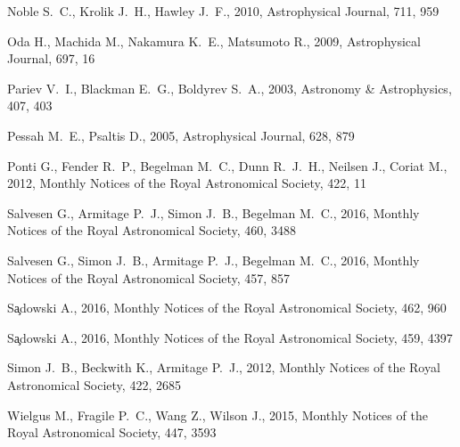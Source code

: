 \documentclass[useAMS,usenatbib]{mn2e}
\newcommand\apj{Astrophysical Journal}
\newcommand\aap{Astronomy \& Astrophysics}
\newcommand\mnras{Monthly Notices of the Royal Astronomical Society}
\begin{document}
\begin{thebibliography}{33}
{Noble} S.~C., {Krolik} J.~H., {Hawley} J.~F., 2010, \apj, 711, 959

{Oda} H., {Machida} M., {Nakamura} K.~E., {Matsumoto} R., 2009, \apj, 697, 16

{Pariev} V.~I., {Blackman} E.~G., {Boldyrev} S.~A., 2003, \aap, 407, 403

{Pessah} M.~E., {Psaltis} D., 2005, \apj, 628, 879

{Ponti} G., {Fender} R.~P., {Begelman} M.~C., {Dunn} R.~J.~H., {Neilsen} J.,
  {Coriat} M., 2012, \mnras, 422, 11

{Salvesen} G., {Armitage} P.~J., {Simon} J.~B., {Begelman} M.~C., 2016, \mnras,
  460, 3488

{Salvesen} G., {Simon} J.~B., {Armitage} P.~J., {Begelman} M.~C.,
  2016{}, \mnras, 457, 857

{S{\c a}dowski} A., 2016{}, \mnras, 462, 960

{S{\c a}dowski} A., 2016{}, \mnras, 459, 4397

{Simon} J.~B., {Beckwith} K., {Armitage} P.~J., 2012, \mnras, 422, 2685

{Wielgus} M., {Fragile} P.~C., {Wang} Z., {Wilson} J., 2015, \mnras, 447, 3593

\end{thebibliography}
\end{document}
